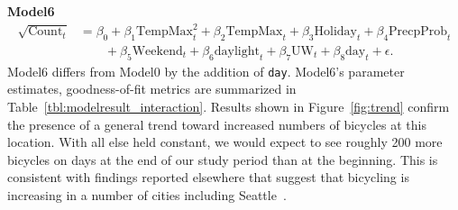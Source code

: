 \documentclass [11pt, proquest] {uwthesis}[2015/03/03]
\begin{document}
\textbf{Model6}
\begin{align}
\sqrt{\text{Count}_t} &= \beta_0 + \beta_1 \text{TempMax}^2_t + \beta_2 \text{TempMax}_t + \beta_3 \text{Holiday}_t + \beta_4 \text{PrecpProb}_t \nonumber\\
&\qquad +\beta_5 \text{Weekend}_t  + \beta_6 \text{daylight}_t + \beta_7 \text{UW}_t + \beta_8\text{day}_t + \epsilon. \label{eqref:model6}
\end{align}
Model6 differs from Model0 by the addition of \texttt{day}. Model6's parameter estimates, goodness-of-fit metrics are summarized in Table~\ref{tbl:modelresult_interaction}. Results shown in Figure~\ref{fig:trend} confirm the presence of a general trend toward increased numbers of bicycles at this location. With all else held constant, we would expect to see roughly 200 more bicycles on days at the end of our study period than at the beginning. This is consistent with findings
reported elsewhere that suggest that bicycling is increasing in a number of cities including Seattle~\cite{League-of-American-Bicyclists:aa}.



%
%
\end{document}
